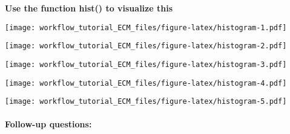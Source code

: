 \documentclass[]{article}
\newenvironment{Shaded}{\begin{snugshade}}{\end{snugshade}}
\newcommand{\KeywordTok}[1]{\textcolor[rgb]{0.13,0.29,0.53}{\textbf{#1}}}
\newcommand{\NormalTok}[1]{#1}
\newcommand{\OperatorTok}[1]{\textcolor[rgb]{0.81,0.36,0.00}{\textbf{#1}}}
\let\oldparagraph\paragraph
\renewcommand{\paragraph}[1]{\oldparagraph{#1}\mbox{}}
\begin{document}
\textbf{Use the function hist() to visualize this}

\begin{Shaded}
\end{Shaded}

\texttt{[image: workflow\_tutorial\_ECM\_files/figure-latex/histogram-1.pdf]}

\begin{Shaded}
\end{Shaded}

\texttt{[image: workflow\_tutorial\_ECM\_files/figure-latex/histogram-2.pdf]}

\begin{Shaded}
\end{Shaded}

\texttt{[image: workflow\_tutorial\_ECM\_files/figure-latex/histogram-3.pdf]}

\begin{Shaded}
\end{Shaded}

\texttt{[image: workflow\_tutorial\_ECM\_files/figure-latex/histogram-4.pdf]}

\begin{Shaded}
\end{Shaded}

\texttt{[image: workflow\_tutorial\_ECM\_files/figure-latex/histogram-5.pdf]}

\hypertarget{follow-up-questions}{%
\paragraph{Follow-up questions:}\label{follow-up-questions}}
\end{document}
